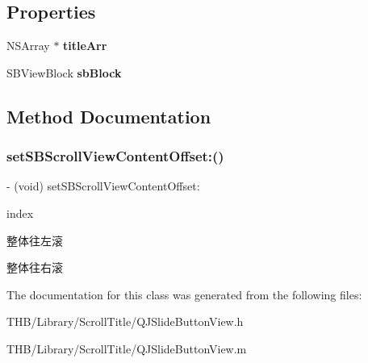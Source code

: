 \subsection*{Properties}
\begin{DoxyCompactItemize}
\item 
\mbox{\label{interface_q_j_slide_button_view_a52bb5ca239477d75669ed7a447ba83f1}} 
N\+S\+Array $\ast$ {\bfseries title\+Arr}
\item 
\mbox{\label{interface_q_j_slide_button_view_ad2defd3ffc9457660b99d0a111f2b575}} 
S\+B\+View\+Block {\bfseries sb\+Block}
\end{DoxyCompactItemize}


\subsection{Method Documentation}
\mbox{\label{interface_q_j_slide_button_view_a2c3623f6d0f09fbf232c5196540e0726}} 
\subsubsection{\texorpdfstring{set\+S\+B\+Scroll\+View\+Content\+Offset\+:()}{setSBScrollViewContentOffset:()}}
{\footnotesize\ttfamily -\/ (void) set\+S\+B\+Scroll\+View\+Content\+Offset\+: \begin{DoxyParamCaption}\item[{(N\+S\+Integer)}]{index }\end{DoxyParamCaption}}

整体往左滚

整体往右滚

The documentation for this class was generated from the following files\+:\begin{DoxyCompactItemize}
\item 
T\+H\+B/\+Library/\+Scroll\+Title/Q\+J\+Slide\+Button\+View.\+h\item 
T\+H\+B/\+Library/\+Scroll\+Title/Q\+J\+Slide\+Button\+View.\+m\end{DoxyCompactItemize}
